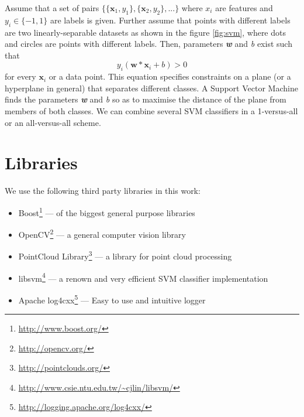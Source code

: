 	Assume that a set of pairs $\{\{\mathbf{x}_1, y_1\}, \{\mathbf{x}_2, y_2\}, ...\}$ where $x_\mathit{i}$ are features and $y_\mathit{i} \in \{-1, 1\}$ are labels is given. Further assume that points with different labels are two linearly-separable datasets as shown in the figure \ref{fig:svm}, where dots and circles are points with different labels. Then, parameters \textbf{\textit{w}} and  \textit{b} exist such that	
	\begin{equation}
	                        y_\mathit{i}\left(\mathbf{w}*\mathbf{x}_\mathit{i} + b\right) > 0                                                                                                                                                                                                                                                                                                                                                                                                                       
	                                                                                                                                                                                                                                                                                                                                                                                                                                               \end{equation}
	for every $\mathbf{x}_\mathit{i}$ or a data point. This equation specifies constraints on a plane (or a hyperplane in general) that separates different classes. A Support Vector Machine finds the parameters \textbf{\textit{w}} and  \textit{b} so as to maximise the distance of the plane from members of both classes. We can combine several SVM classifiers in a 1-versus-all or an all-versus-all scheme.
	
\section{Libraries}

	We use the following third party libraries in this work:
	\begin{itemize}
	 \item Boost\footnote{\url{http://www.boost.org/}} --- of the biggest general purpose libraries
	 \item OpenCV\footnote{\url{http://opencv.org/}} --- a general computer vision library
	 \item PointCloud Library\footnote{\url{http://pointclouds.org/}} \cite{PCL} --- a library for point cloud processing
	 \item libsvm\footnote{\url{http://www.csie.ntu.edu.tw/~cjlin/libsvm/}} \cite{libsvm} --- a renown and very efficient SVM classifier implementation
	 \item Apache log4cxx\footnote{\url{http://logging.apache.org/log4cxx/}} --- Easy to use and intuitive logger
	\end{itemize}
	
